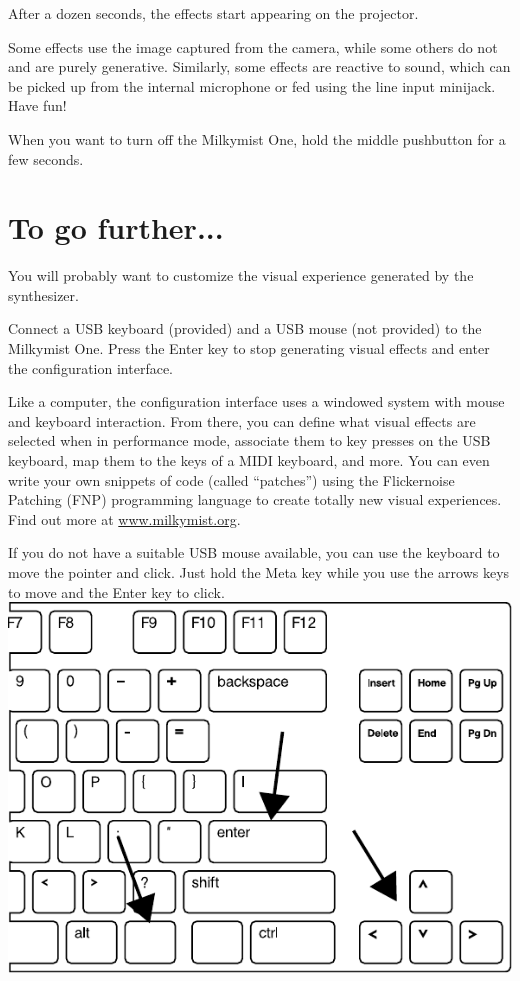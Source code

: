 \documentclass{leaflet}
\begin{document}
After a dozen seconds, the effects start appearing on the projector.

Some effects use the image captured from the camera, while some others do not and are purely generative. Similarly, some effects are reactive to sound, which can be picked up from the internal microphone or fed using the line input minijack. Have fun!

When you want to turn off the Milkymist One, hold the middle pushbutton for a few seconds.

\section{To go further...}
You will probably want to customize the visual experience generated by the synthesizer.

Connect a USB keyboard (provided) and a USB mouse (not provided) to the Milkymist One. Press the Enter key to stop generating visual effects and enter the configuration interface.

Like a computer, the configuration interface uses a windowed system with mouse and keyboard interaction. From there, you can define what visual effects are selected when in performance mode, associate them to key presses on the USB keyboard, map them to the keys of a MIDI keyboard, and more. You can even write your own snippets of code (called ``patches'') using the Flickernoise Patching (FNP) programming language to create totally new visual experiences. Find out more at \url{www.milkymist.org}.

If you do not have a suitable USB mouse available, you can use the keyboard to move the pointer and click. Just hold the Meta key while you use the arrows keys to move and the Enter key to click.
\includegraphics[width=\textwidth]{keyboard.pdf}
\end{document}
